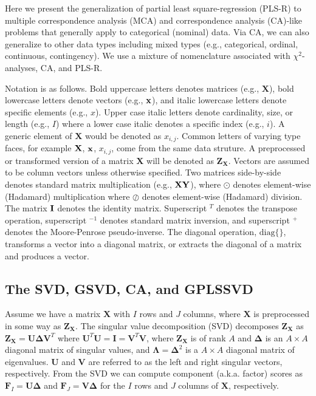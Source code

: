 \documentclass[12pt]{article}
\begin{document}
\label{section:PLSCAR}

Here we present the generalization of partial least square-regression
(PLS-R) to multiple correspondence analysis (MCA) and correspondence
analysis (CA)-like problems that generally apply to categorical
(nominal) data. Via CA, we can also generalize to other data types
including mixed types (e.g., categorical, ordinal, continuous,
contingency). We use a mixture of nomenclature associated with
\(\chi^2\)-analyses, CA, and PLS-R.

Notation is as follows. Bold uppercase letters denotes matrices (e.g.,
\(\mathbf{X}\)), bold lowercase letters denote vectors (e.g.,
\(\bf{x}\)), and italic lowercase letters denote specific elements
(e.g., \(x\)). Upper case italic letters denote cardinality, size, or
length (e.g., \(I\)) where a lower case italic denotes a specific index
(e.g., \(i\)). A generic element of \(\mathbf{X}\) would be denoted as
\(x_{i,j}\). Common letters of varying type faces, for example
\({\bf X}\), \(\bf{x}\), \(x_{i,j}\), come from the same data struture.
A preprocessed or transformed version of a matrix \({\mathbf X}\) will
be denoted as \({\mathbf Z}_{\mathbf X}\). Vectors are assumed to be
column vectors unless otherwise specified. Two matrices side-by-side
denotes standard matrix multiplication (e.g., \(\bf{X}\bf{Y}\)), where
\(\odot\) denotes element-wise (Hadamard) multiplication where
\(\oslash\) denotes element-wise (Hadamard) division. The matrix
\({\bf I}\) denotes the identity matrix. Superscript \(^{T}\) denotes
the transpose operation, superscript \(^{-1}\) denotes standard matrix
inversion, and superscript \(^{+}\) denotes the Moore-Penrose
pseudo-inverse. The diagonal operation, \(\mathrm{diag\{\}}\),
transforms a vector into a diagonal matrix, or extracts the diagonal of
a matrix and produces a vector.

\hypertarget{the-svd-gsvd-ca-and-gplssvd}{%
\subsection{The SVD, GSVD, CA, and
GPLSSVD}\label{the-svd-gsvd-ca-and-gplssvd}}

\label{section:GSVDCA}

Assume we have a matrix \({\mathbf X}\) with \(I\) rows and \(J\)
columns, where \({\mathbf X}\) is preprocessed in some way as
\({\mathbf Z}_{\mathbf X}\). The singular value decomposition (SVD)
decomposes \({\mathbf Z}_{\mathbf X}\) as
\({\mathbf Z}_{\mathbf X} = {\mathbf U} {\boldsymbol \Delta} {\mathbf V}^{T}\)
where
\({\mathbf U}^{T}{\mathbf U} = {\mathbf I} = {\mathbf V}^{T}{\mathbf V}\),
where \({\mathbf Z}_{\mathbf X}\) is of rank \(A\) and
\({\boldsymbol \Delta}\) is an \(A \times A\) diagonal matrix of
singular values, and \({\boldsymbol \Lambda} = {\boldsymbol \Delta}^2\)
is a \(A \times A\) diagonal matrix of eigenvalues. \({\mathbf U}\) and
\({\mathbf V}\) are referred to as the left and right singular vectors,
respectively. From the SVD we can compute component (a.k.a. factor)
scores as \({\mathbf F}_{I} = {\mathbf U}{\boldsymbol \Delta}\) and
\({\mathbf F}_{J} = {\mathbf V}{\boldsymbol \Delta}\) for the \(I\) rows
and \(J\) columns of \({\mathbf X}\), respectively.
\end{document}
